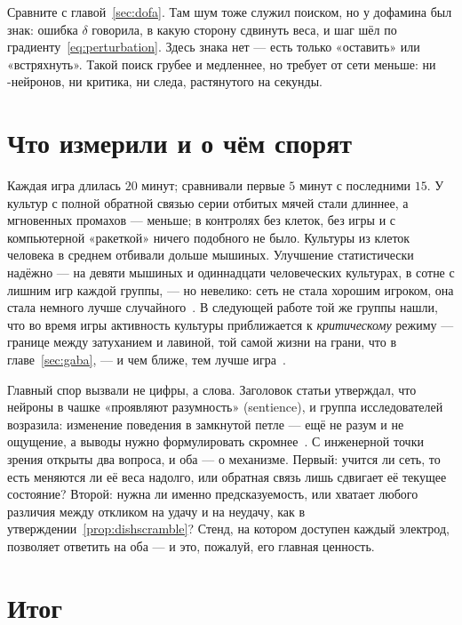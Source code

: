Сравните с главой~\ref{sec:dofa}. Там шум тоже служил поиском, но у дофамина был знак: ошибка $\delta$ говорила, в какую сторону сдвинуть веса, и шаг шёл по градиенту~\eqref{eq:perturbation}. Здесь знака нет --- есть только «оставить» или «встряхнуть». Такой поиск грубее и медленнее, но требует от сети меньше: ни -нейронов, ни критика, ни следа, растянутого на секунды.

\section{Что измерили и о чём спорят}

Каждая игра длилась $20$ минут; сравнивали первые $5$ минут с последними $15$. У культур с полной обратной связью серии отбитых мячей стали длиннее, а мгновенных промахов --- меньше; в контролях без клеток, без игры и с компьютерной «ракеткой» ничего подобного не было. Культуры из клеток человека в среднем отбивали дольше мышиных. Улучшение статистически надёжно --- на девяти мышиных и одиннадцати человеческих культурах, в сотне с лишним игр каждой группы, --- но невелико: сеть не стала хорошим игроком, она стала немного лучше случайного~\cite{Kagan2022}. В следующей работе той же группы нашли, что во время игры активность культуры приближается к \emph{критическому} режиму --- границе между затуханием и лавиной, той самой жизни на грани, что в главе~\ref{sec:gaba}, --- и чем ближе, тем лучше игра~\cite{Habibollahi2023}.

Главный спор вызвали не цифры, а слова. Заголовок статьи утверждал, что нейроны в чашке «проявляют разумность» (sentience), и группа исследователей возразила: изменение поведения в замкнутой петле --- ещё не разум и не ощущение, а выводы нужно формулировать скромнее~\cite{Balci2023}. С инженерной точки зрения открыты два вопроса, и оба --- о механизме. Первый: учится ли сеть, то есть меняются ли её веса надолго, или обратная связь лишь сдвигает её текущее состояние? Второй: нужна ли именно предсказуемость, или хватает любого различия между откликом на удачу и на неудачу, как в утверждении~\ref{prop:dishscramble}? Стенд, на котором доступен каждый электрод, позволяет ответить на оба --- и это, пожалуй, его главная ценность.

\section{Итог}

